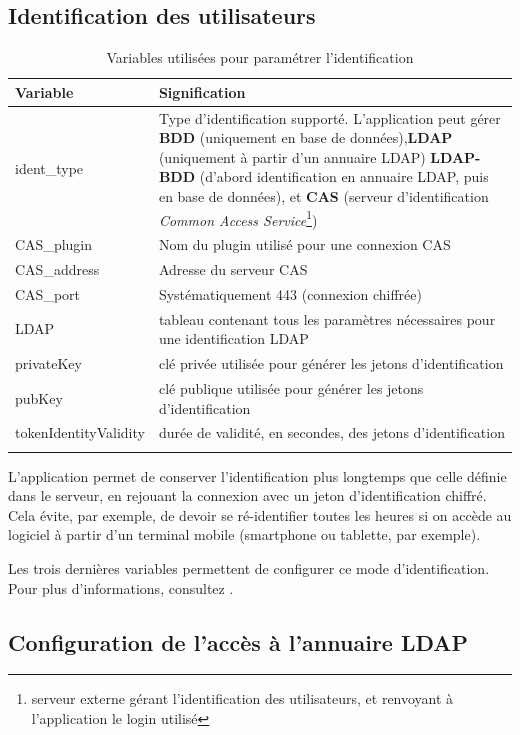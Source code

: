 \subsection{Identification des utilisateurs}

\begin{longtable}{|p{5cm}|p{10cm}|}
\hline
\textbf{Variable} & \textbf{Signification} \\
\hline
\endhead
ident\_type & Type d'identification supporté. L'application peut gérer \textbf{BDD} (uniquement en base de données),\textbf{LDAP} (uniquement à partir d'un annuaire LDAP) \textbf{LDAP-BDD} (d'abord identification en annuaire LDAP, puis en base de données), et \textbf{CAS} (serveur d'identification \textit{Common Access Service}\footnote{serveur externe gérant l'identification des utilisateurs, et renvoyant à l'application le login utilisé})\\
\hline
CAS\_plugin & Nom du plugin utilisé pour une connexion CAS \\
\hline
CAS\_address & Adresse du serveur CAS\\
\hline
CAS\_port & Systématiquement 443 (connexion chiffrée)\\
\hline
LDAP & tableau contenant tous les paramètres nécessaires pour une identification LDAP \\
\hline
privateKey & clé privée utilisée pour générer les jetons d'identification \\
\hline
pubKey & clé publique utilisée pour générer les jetons d'identification \\
\hline
tokenIdentityValidity & durée de validité, en secondes, des jetons d'identification\\
\hline
\caption{Variables utilisées pour paramétrer l'identification}
\end{longtable}

L'application permet de conserver l'identification plus longtemps que celle définie dans le serveur, en rejouant la connexion avec un jeton d'identification chiffré. Cela évite, par exemple, de devoir se ré-identifier toutes les heures si on accède au logiciel à partir d'un terminal mobile (smartphone ou tablette, par exemple).

Les trois dernières variables permettent de configurer ce mode d'identification. Pour plus d'informations, consultez \cite{token}.

\subsection{Configuration de l'accès à l'annuaire LDAP}

